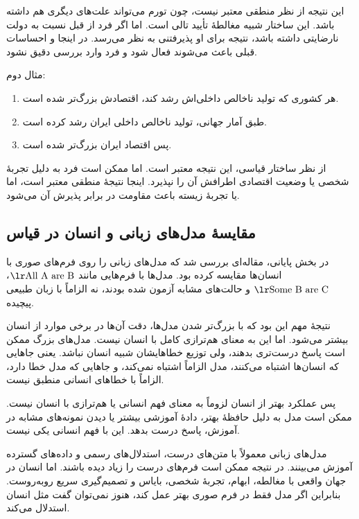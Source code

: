 این نتیجه از نظر منطقی معتبر نیست، چون تورم می‌تواند علت‌های دیگری هم داشته باشد. این ساختار شبیه مغالطهٔ تأیید تالی است. اما اگر فرد از قبل نسبت به دولت نارضایتی داشته باشد، نتیجه برای او پذیرفتنی به نظر می‌رسد. در اینجا  و احساسات قبلی باعث می‌شوند  فعال شود و فرد وارد بررسی دقیق  نشود.

مثال دوم:

\begin{enumerate}
  \item هر کشوری که تولید ناخالص داخلی‌اش رشد کند، اقتصادش بزرگ‌تر شده است.
  \item طبق آمار جهانی، تولید ناخالص داخلی ایران رشد کرده است.
  \item پس اقتصاد ایران بزرگ‌تر شده است.
\end{enumerate}

از نظر ساختار قیاسی، این نتیجه معتبر است. اما ممکن است فرد به دلیل تجربهٔ شخصی یا وضعیت اقتصادی اطرافش آن را نپذیرد. اینجا نتیجهٔ منطقی معتبر است، اما  یا تجربهٔ زیسته باعث مقاومت در برابر پذیرش آن می‌شود.

\subsection{مقایسهٔ مدل‌های زبانی و انسان در قیاس}
در بخش پایانی، مقاله‌ای بررسی شد که مدل‌های زبانی را روی فرم‌های صوری  با انسان‌ها مقایسه کرده بود. مدل‌ها با فرم‌هایی مانند \(\text{\eng{All A are B}}\)، \(\text{\eng{Some B are C}}\) و حالت‌های مشابه آزمون شده بودند، نه الزاماً با زبان طبیعی پیچیده.

نتیجهٔ مهم این بود که با بزرگ‌تر شدن مدل‌ها، دقت آن‌ها در برخی موارد از انسان بیشتر می‌شود. اما این به معنای هم‌ترازی کامل با انسان نیست. مدل‌های بزرگ ممکن است پاسخ درست‌تری بدهند، ولی توزیع خطاهایشان شبیه انسان نباشد. یعنی جاهایی که انسان‌ها اشتباه می‌کنند، مدل الزاماً اشتباه نمی‌کند، و جاهایی که مدل خطا دارد، الزاماً با خطاهای انسانی منطبق نیست.


پس عملکرد بهتر از انسان لزوماً به معنای فهم انسانی یا هم‌ترازی با انسان نیست. ممکن است مدل به دلیل حافظهٔ بهتر، دادهٔ آموزشی بیشتر یا دیدن نمونه‌های مشابه در آموزش، پاسخ درست بدهد. این با فهم انسانی یکی نیست.

مدل‌های زبانی معمولاً با متن‌های درست، استدلال‌های رسمی و داده‌های گسترده آموزش می‌بینند. در نتیجه ممکن است فرم‌های درست را زیاد دیده باشند. اما انسان در جهان واقعی با مغالطه، ابهام، تجربهٔ شخصی، بایاس و تصمیم‌گیری سریع روبه‌روست. بنابراین اگر مدل فقط در فرم صوری بهتر عمل کند، هنوز نمی‌توان گفت مثل انسان استدلال می‌کند.

